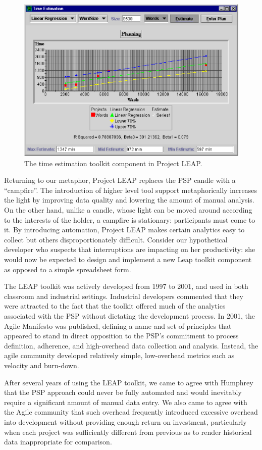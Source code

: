 \documentclass[]{article}
\begin{document}
\begin{figure}[!tb]
\centering
\includegraphics[width=0.50\columnwidth]{planword.eps}
\caption{The time estimation toolkit component in Project LEAP.}
\label{fig:leap}
\end{figure}

Returning to our metaphor, Project LEAP replaces the PSP candle with a
``campfire''.  The introduction of higher level tool support metaphorically increases the
light by improving data quality and lowering the amount of manual analysis.  On the other
hand, unlike a candle, whose light can be moved around according to the interests
of the holder, a campfire is stationary: participants must come to it.  By introducing
automation, Project LEAP makes certain analytics easy to collect but others
disproportionately difficult.  Consider our hypothetical developer who suspects that
interruptions are impacting on her productivity: she would now be expected to design and
implement a new Leap toolkit component as opposed to a simple spreadsheet form.  

The LEAP toolkit was actively developed from 1997 to 2001, and used in
both classroom and industrial settings.  Industrial developers commented that they were
attracted to the fact that the toolkit offered much of the analytics associated with the
PSP without dictating the development process.  In 2001, the Agile Manifesto
\cite{AgileManifesto} was published, defining a name and set of principles that appeared
to stand in direct opposition to the PSP's commitment to process definition, adherence,
and high-overhead data collection and analysis. Instead, the agile community developed
relatively simple, low-overhead metrics such as velocity and burn-down.

After several years of using the LEAP toolkit, we came to agree with Humphrey that the PSP
approach could never be fully automated and would inevitably require a significant amount
of manual data entry.  We also came to agree with the Agile community that such overhead
frequently introduced excessive overhead into development without providing enough return
on investment, particularly when each project was sufficiently different from previous as
to render historical data inappropriate for comparison.
\end{document}
